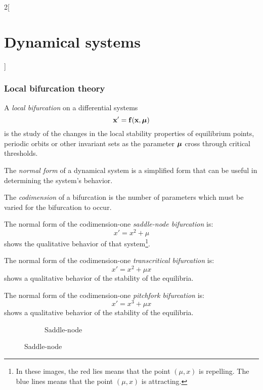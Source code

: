 \documentclass[../../../main_math.tex]{subfiles}
\begin{document}
\begin{multicols}{2}[\section{Dynamical systems}]
  \subsubsection{Local bifurcation theory}
  \begin{definition}
    A \emph{local bifurcation} on a differential systems
    \begin{equation}\label{DS:mu-system}
      \boldsymbol{\mathrm{x}}'=\boldsymbol{\mathrm{f}}(\boldsymbol{\mathrm{x}},\boldsymbol{\mathrm{\mu}})
    \end{equation}
    is the study of the changes in the local stability properties of equilibrium points, periodic orbits or other invariant sets as the parameter $\boldsymbol{\mathrm{\mu}}$ cross through critical thresholds.
  \end{definition}
  \begin{definition}
    The \emph{normal form} of a dynamical system is a simplified form that can be useful in determining the system's behavior.
  \end{definition}
  \begin{definition}
    The \emph{codimension} of a bifurcation is the number of parameters which must be varied for the bifurcation to occur.
  \end{definition}
  \begin{definition}
    The normal form of the codimension-one \emph{saddle-node bifurcation} is: $$x'=x^2+\mu$$
     shows the qualitative behavior of that system\footnote{In these images, the red lies means that the point $(\mu,x)$ is repelling. The blue lines means that the point $(\mu,x)$ is attracting.}.
  \end{definition}
  \begin{definition}
    The normal form of the codimension-one \emph{transcritical bifurcation} is: $$x'=x^2+\mu x$$
     shows a qualitative behavior of the stability of the equilibria.
  \end{definition}
  \begin{definition}
    The normal form of the codimension-one \emph{pitchfork bifurcation} is: $$x'=x^3+\mu x$$
     shows a qualitative behavior of the stability of the equilibria.
  \end{definition}
  \begin{figure}[H]
    \centering
    \begin{subfigure}[b]{0.32\linewidth}
      \centering
      
      \caption{Saddle-node}

\end{subfigure}
\end{figure}
\end{multicols}
\end{document}
